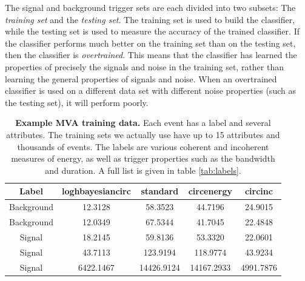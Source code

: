\documentclass[11pt]{cuthesis}
\begin{document}

The signal and background trigger sets are each divided into two subsets: The \emph{training set} and the \emph{testing set}. The training set is used to build the classifier, while the testing set is used to measure the accuracy of the trained classifier. If the classifier performs much better on the training set than on the testing set, then the classifier is \emph{overtrained}. This means that the classifier has learned the properties of precisely the signals and noise in the training set, rather than learning the general properties of signals and noise. When an overtrained classifier is used on a different data set with different noise properties (such as the testing set), it will perform poorly. 

\begin{table}
\begin{tabular}{| c | c | c | c | c |} 
 \hline
Label & loghbayesiancirc & standard & circenergy & circinc  \\ [0.5ex] 
 \hline\hline
Background & 12.3128 & 58.3523 & 44.7196 & 24.9015 \\ 
 \hline
Background & 12.0349 & 67.5344 & 41.7045 & 22.4848 \\
 \hline
Signal & 18.2145 & 59.8136 & 53.3320 & 22.0601 \\
 \hline
Signal & 43.7113 & 123.9194 & 118.9774 & 43.9234 \\
 \hline
Signal & 6422.1467 & 14426.9124 & 14167.2933 & 4991.7876 \\ [1ex] 
 \hline
 
\end{tabular}
\caption{\textbf{Example MVA training data.} Each event has a label and several attributes. The training sets we actually use have up to 15 attributes and thousands of events. The labels are various coherent and incoherent measures of energy, as well as trigger properties such as the bandwidth and duration. A full list is given in table \ref{tab:labels}.}
\label{table:1}
\end{table}
\end{document}
